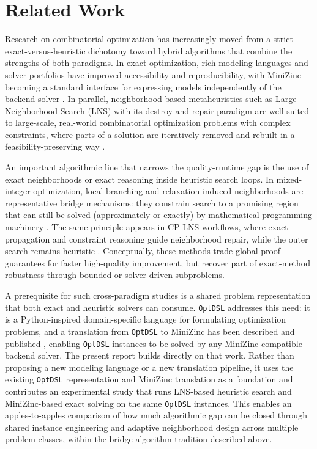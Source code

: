 \documentclass[11pt,a4paper]{article}
\begin{document}
\section{Related Work}
Research on combinatorial optimization has increasingly moved from a strict exact-versus-heuristic dichotomy toward hybrid algorithms that combine the strengths of both paradigms.
In exact optimization, rich modeling languages and solver portfolios have improved accessibility and reproducibility, with MiniZinc becoming a standard interface for expressing models independently of the backend solver \citep{nethercote2007minizinc,stuckey2014minizinc}.
In parallel, neighborhood-based metaheuristics such as Large Neighborhood Search (LNS) with its destroy-and-repair paradigm are well suited to large-scale, real-world combinatorial optimization problems with complex constraints, where parts of a solution are iteratively removed and rebuilt in a feasibility-preserving way \citep{shaw1998lns,ropke2006alns,pisinger2010lns,pisinger2019lns}.

An important algorithmic line that narrows the quality-runtime gap is the use of exact neighborhoods or exact reasoning inside heuristic search loops.
In mixed-integer optimization, local branching and relaxation-induced neighborhoods are representative bridge mechanisms: they constrain search to a promising region that can still be solved (approximately or exactly) by mathematical programming machinery \citep{fischetti2003localbranching,danna2005rin}.
The same principle appears in CP-LNS workflows, where exact propagation and constraint reasoning guide neighborhood repair, while the outer search remains heuristic \citep{shaw1998lns,pisinger2010lns,pisinger2019lns}.
Conceptually, these methods trade global proof guarantees for faster high-quality improvement, but recover part of exact-method robustness through bounded or solver-driven subproblems.

A prerequisite for such cross-paradigm studies is a shared problem representation that both exact and heuristic solvers can consume.
\texttt{OptDSL} addresses this need: it is a Python-inspired domain-specific language for formulating optimization problems, and a translation from \texttt{OptDSL} to MiniZinc has been described and published \citep{delrio2026optdsl}, enabling \texttt{OptDSL} instances to be solved by any MiniZinc-compatible backend solver.
The present report builds directly on that work.
Rather than proposing a new modeling language or a new translation pipeline, it uses the existing \texttt{OptDSL} representation and MiniZinc translation as a foundation and contributes an experimental study that runs LNS-based heuristic search and MiniZinc-based exact solving on the same \texttt{OptDSL} instances.
This enables an apples-to-apples comparison of how much algorithmic gap can be closed through shared instance engineering and adaptive neighborhood design across multiple problem classes, within the bridge-algorithm tradition described above.
\end{document}
